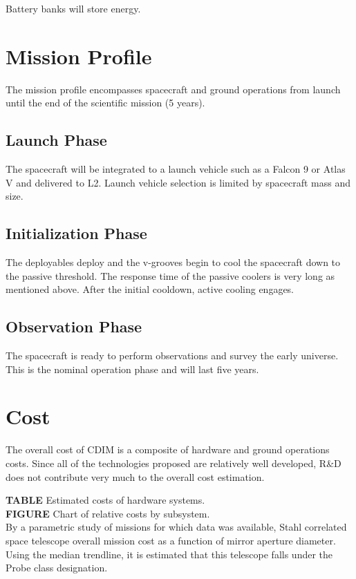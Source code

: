 \documentclass{ws-jai}
\begin{document}
Battery banks will store energy.

\section{Mission Profile}
\label{S:mission}
The mission profile encompasses spacecraft and ground operations from launch until the end of the scientific mission (5 years).

\subsection{Launch Phase}
\label{sS:launch}
The spacecraft will be integrated to a launch vehicle such as a Falcon 9 or Atlas V and delivered to L2. Launch vehicle selection is limited by spacecraft mass and size.

\subsection{Initialization Phase}
\label{sS:initphase}
The deployables deploy and the v-grooves begin to cool the spacecraft down to the passive threshold. The response time of the passive coolers is very long as mentioned above. After the initial cooldown, active cooling engages.

\subsection{Observation Phase}
\label{sS:obsphase}
The spacecraft is ready to perform observations and survey the early universe. This is the nominal operation phase and will last five years.

\section{Cost}
\label{S:cost}
The overall cost of CDIM is a composite of hardware and ground operations costs. Since all of the technologies proposed are relatively well developed, R\&D does not contribute very much to the overall cost estimation.

\textbf{TABLE} Estimated costs of hardware systems.\\

\textbf{FIGURE} Chart of relative costs by subsystem.\\

By a parametric study of missions for which data was available, Stahl correlated space telescope overall mission cost as a function of mirror aperture diameter. Using the median trendline, it is estimated that this telescope falls under the Probe class designation.
\end{document}
